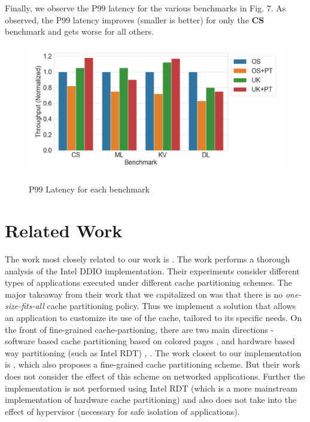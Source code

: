 \documentclass[sigconf,authorversion,noacm]{acmart}
\begin{document}
Finally, we observe the P99 latency for the various benchmarks in Fig. 7. As
observed, the P99 latency improves (smaller is better) for only the \textbf{CS}
benchmark and gets worse for all others.

\begin{figure}[h]
  \centering
  \includegraphics[width=\linewidth]{res3}
    \label{fig:motivating}
    \vspace{-2em}
    \caption{P99 Latency for each benchmark}
\end{figure}

\section{Related Work}
The work most closely related to our work is \cite{alireza_2020}. The work
performs a thorough analysis of the Intel DDIO implementation. Their experiments
consider different types of applications executed under different cache
partitioning schemes. The major takeaway from their work that we capitalized on
was that there is no \textit{one-size-fits-all} cache partitioning policy. Thus
we implement a solution that allows an application to customize its use of the
cache, tailored to its specific needs. On the front of fine-grained
cache-partioning, there are two main directions - software based cache
partitioning based on colored pages \cite{herter}, \cite{sherwood} and hardware
based way partitioning (such as Intel RDT) \cite{chen}, \cite{assaf}. The work
closest to our implementation is \cite{swap}, which also proposes a fine-grained
cache partitioning scheme. But their work does not consider the effect of this
scheme on networked applications. Further the implementation is not performed
using Intel RDT (which is a more mainstream implementation of hardware cache
partitioning) and also does not take into the effect of hypervisor (necessary
for safe isolation of applications).
\end{document}

